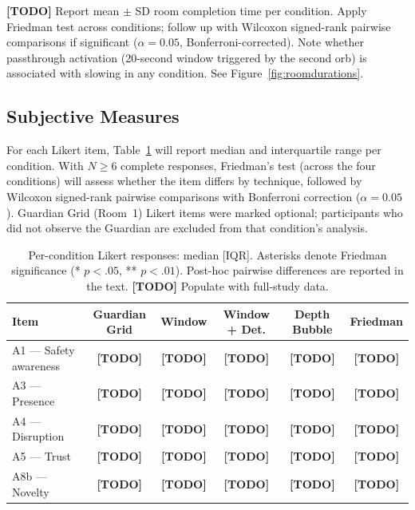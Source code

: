 \documentclass{styling/vgtc} %
\begin{document}
\textbf{[TODO]} Report mean $\pm$ SD room completion time per condition.
Apply Friedman test across conditions; follow up with Wilcoxon
signed-rank pairwise comparisons if significant ($\alpha = 0.05$,
Bonferroni-corrected). Note whether passthrough activation (20-second
window triggered by the second orb) is associated with slowing in
any condition. See Figure~\ref{fig:roomdurations}.


\subsection{Subjective Measures}
\label{sec:subjective}

For each Likert item, Table~\ref{tab:likert} will report median and
interquartile range per condition. With $N \geq 6$ complete responses,
Friedman's test (across the four conditions) will assess whether the
item differs by technique, followed by Wilcoxon signed-rank pairwise
comparisons with Bonferroni correction ($\alpha = 0.05$). Guardian Grid
(Room~1) Likert items were marked optional; participants who did not
observe the Guardian are excluded from that condition's analysis.

\begin{table}[t]
\centering
\caption{Per-condition Likert responses: median [IQR]. Asterisks denote
  Friedman significance (* $p < .05$, ** $p < .01$). Post-hoc pairwise
  differences are reported in the text. \textbf{[TODO]} Populate with
  full-study data.}
\label{tab:likert}
\renewcommand{\arraystretch}{1.2}
\small
\begin{tabular}{@{} l c c c c c @{}}
\toprule
\textbf{Item} &
  \textbf{Guardian Grid} &
  \textbf{Window} &
  \textbf{Window + Det.} &
  \textbf{Depth Bubble} &
  \textbf{Friedman} \\
\midrule
A1 — Safety awareness     & \textbf{[TODO]} & \textbf{[TODO]} & \textbf{[TODO]} & \textbf{[TODO]} & \textbf{[TODO]} \\
A3 — Presence             & \textbf{[TODO]} & \textbf{[TODO]} & \textbf{[TODO]} & \textbf{[TODO]} & \textbf{[TODO]} \\
A4 — Disruption           & \textbf{[TODO]} & \textbf{[TODO]} & \textbf{[TODO]} & \textbf{[TODO]} & \textbf{[TODO]} \\
A5 — Trust                & \textbf{[TODO]} & \textbf{[TODO]} & \textbf{[TODO]} & \textbf{[TODO]} & \textbf{[TODO]} \\
A8b — Novelty             & \textbf{[TODO]} & \textbf{[TODO]} & \textbf{[TODO]} & \textbf{[TODO]} & \textbf{[TODO]} \\
\bottomrule
\end{tabular}
\end{table}
\end{document}
